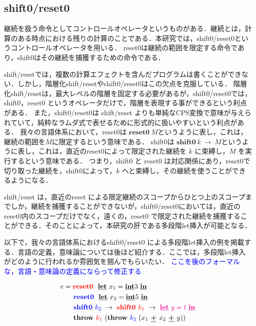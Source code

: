 \documentclass[T]{compsoft}
\newcommand\red[1]{\textcolor{red}{#1}}
\newcommand\magenta[1]{\textcolor{magenta}{#1}}
\newcommand\blue[1]{\textcolor{blue}{#1}}
\newcommand\Resetz{\textbf{reset0}}
\newcommand\Shiftz{\textbf{shift0}}
\newcommand\Throw{\textbf{throw}}
\newcommand\cPlus{\underline{\textbf{+}}}
\newcommand\cLet{\underline{\textbf{let}}}
\newcommand\cIn{\underline{\textbf{in}}}
\newcommand\cint{\underline{\textbf{int}}}
\newcommand\ooi[1]{\blue{{#1}}}
\theoremstyle{break}
\begin{document}
\subsection{shift0/reset0}
継続を扱う命令としてコントロールオペレータというものがある．継続とは，計算のある時点における残りの計算のことである．本研究では，shift0/reset0というコントロールオペレータを用いる．
reset0は継続の範囲を限定する命令であり，shift0はその継続を捕獲するための命令である．

shift/reset\cite{Danvy1990}では，複数の計算エフェクトを含んだプログラムは書くことができない．しかし，階層化shift/resetやshift0/reset0はこの欠点を克服している．
階層化shift/reset\cite{Danvy1990}は，最大レベルの階層を固定する必要があるが，shift0/reset0では，shift0，reset0 というオペレータだけで，階層を表現する事ができるという利点がある．
また，shift0/reset0は shift/reset よりも単純なCPS変換で意味が与えられていて，純粋なラムダ式で表せるために形式的に扱いやすいという利点がある．
我々の言語体系において，reset0は $\Resetz ~M$というように表し，これは，継続の範囲を$M$に限定するという意味である．
shift0は $\Shiftz ~k ~\to ~M$というように表し，これは，直近のreset0によって限定された継続を $k$ に束縛し，$M$ を実行するという意味である．
つまり，shift0 と reset0 は対応関係にあり，reset0で切り取った継続を，shift0によって，$k$ へと束縛し，その継続を使うことができるようになる．

shift/reset\cite{Danvy1990} は，直近のreset による限定継続のスコープからひとつ上のスコープまでしか，継続を捕獲することができないが，shift0/reset0においては，直近の reset0内のスコープだけでなく，遠くの，reset0 で限定された継続を捕獲することができる．そのことによって，本研究の肝である多段階let挿入が可能となる．

以下で，我々の言語体系におけるshift0/reset0 による多段階let挿入の例を掲載する．言語の定義，意味論については後ほど紹介する．ここでは，多段階let挿入がどのように行われるか雰囲気を掴んでもらいたい．
\ooi{ここを後のフォーマルな，言語・意味論の定義にならって修正する}

\begin{align*}
  e &= \red{\Resetz} ~~\cLet~x_1=\cint{3}~\cIn \\
    &\phantom{=}~~ \blue{\Resetz} ~~\cLet~x_2=\cint{5}~\cIn \\
    &\phantom{=}~~ \blue{\Shiftz}~\blue{k_2}~\to~ \red{\Shiftz}~\red{k_1}~\to~ \magenta{\cLet~y=t~\cIn} \\
    &\phantom{=}~~ \Throw~\red{k_1}~(\Throw~\blue{k_2}~(x_1~\cPlus~x_2~\cPlus~y))
\end{align*}
\end{document}
